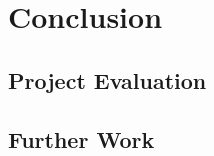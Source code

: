 \documentclass[main.tex]{subfiles}
\begin{document}
\chapter{Conclusion}
\section{Project Evaluation}
\section{Further Work}
\end{document}
